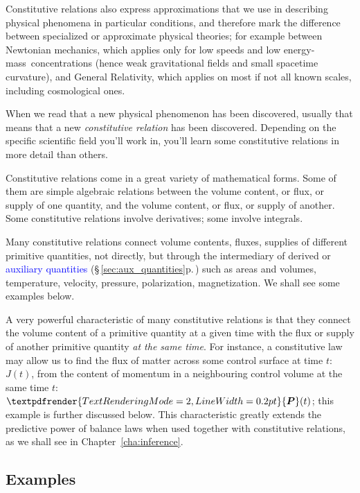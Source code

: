 \documentclass[a4paper,12pt,%
onecolumn,oneside,%
british%
]{memoir}
\renewcommand*{\bm}[1]{\textpdfrender{TextRenderingMode=2,LineWidth=0.2pt}{\boldsymbol{#1}}}
\renewcommand*{\|}[1][]{\nonscript\:#1\vert\nonscript\:\mathopen{}}
\newcommand*{\sect}{\S}%
\newcommand*{\chap}{Chapter}%
\renewcommand*{\autoref}[3][\sect\,\ref]{\textcolor{blue}{#3} {\color{blue}\scriptsize(\faIcon[regular]{eye}\;#1{#2}\;p.\,\pageref{#2})}}
\newcommand*{\energym}{energy-mass}
\newcommand*{\yJ}{J}
\newcommand*{\yP}{\bm{P}}
\begin{document}
Constitutive relations also express approximations that we use in describing physical phenomena in particular conditions, and therefore mark the difference between specialized or approximate physical theories; for example between Newtonian mechanics, which applies only for low speeds and low \energym\ concentrations (hence weak gravitational fields and small spacetime curvature), and General Relativity, which applies on most if not all known scales, including cosmological ones.

When we read that a new physical phenomenon has been discovered, usually that means that a new \emph{constitutive relation} has been discovered. Depending on the specific scientific field you'll work in, you'll learn some constitutive relations in more detail than others.

\medskip

Constitutive relations come in a great variety of mathematical forms. Some of them are simple algebraic relations between the volume content, or flux, or supply of one quantity, and the volume content, or flux, or supply of another. Some constitutive relations involve derivatives; some involve integrals.

Many constitutive relations connect volume contents, fluxes, supplies of different primitive quantities, not directly, but through the intermediary of derived or \autoref{sec:aux_quantities}{auxiliary quantities} such as areas and volumes, temperature, velocity, pressure, polarization, magnetization. We shall see some examples below.

\medskip

A very powerful characteristic of many constitutive relations is that they connect the volume content of a primitive quantity at a given time with the flux or supply of another primitive quantity \emph{at the same time}. For instance, a constitutive law may allow us to find the flux of matter across some control surface at time $t$: $\yJ(t)$, from the content of momentum in a neighbouring control volume at the same time $t$: $\yP(t)$; this example is further discussed below. This characteristic greatly extends the predictive power of balance laws when used together with constitutive relations, as we shall see in \chap~\ref{cha:inference}.



\subsection{Examples}
\label{sec:example_constitutive}
\end{document}
